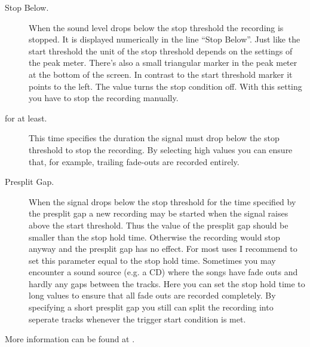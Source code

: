 \begin{description}
  \item[Stop Below.]
    When the sound level drops below the stop threshold the recording is stopped.
    It is displayed numerically in the line ``Stop Below''. Just like the start
    threshold the unit of the stop threshold depends on the settings of the peak
    meter. There's also a small triangular marker in the peak meter at the bottom
    of the screen. In contrast to the start threshold marker it points to the
    left. The value  turns the stop condition off. With this setting you
    have to stop the recording manually.
    
  \item[for at least.]
    This time specifies the duration the signal must drop below the stop
    threshold to stop the recording. By selecting high values you can ensure
    that, for example, trailing fade-outs are recorded entirely.
    
  \item[Presplit Gap.]
    When the signal drops below the stop threshold for the time specified by the
    presplit gap a new recording may be started when the signal raises above the
    start threshold. Thus the value of the presplit gap should be smaller than
    the stop hold time. Otherwise the recording would stop anyway and the
    presplit gap has no effect. For most uses I recommend to set this parameter
    equal to the stop hold time. Sometimes you may encounter a sound source (e.g.
    a CD) where the songs have fade outs and hardly any gaps between the tracks.
    Here you can set the stop hold time to long values to ensure that all fade
    outs are recorded completely. By specifying a short presplit gap you still
    can split the recording into seperate tracks whenever the trigger start
    condition is met.
    
  \end{description}
  
More information can be found at .
  
